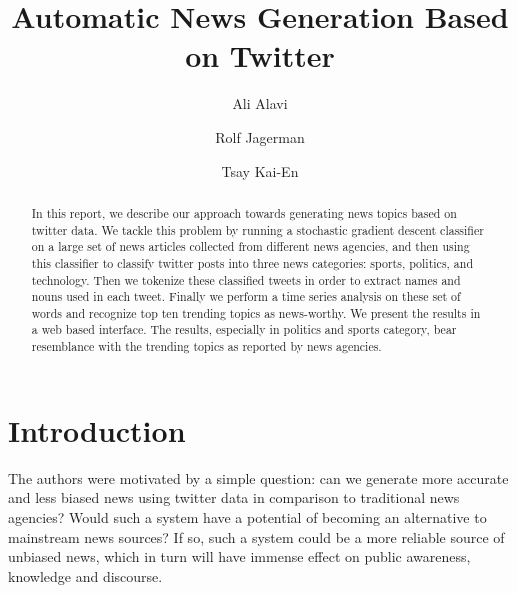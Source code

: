 \documentclass{llncs}
\begin{document}
%
\mainmatter              %
\pagestyle{headings}

%
\title{Automatic News Generation Based on Twitter}
%
%
\author{Ali Alavi \and Rolf Jagerman \and
Tsay Kai-En}
%
%
%

\maketitle              %
%

\begin{abstract}
In this report, we describe our approach towards generating news topics based on twitter data. We tackle this problem by running a stochastic gradient descent classifier on a large set of news articles collected from different news agencies, and then using this classifier to classify twitter posts into three news categories: sports, politics, and technology. Then we tokenize these classified tweets in order to extract names and nouns used in each tweet. Finally we perform a time series analysis on these set of words and recognize top ten trending topics as news-worthy. We present the results in a web based interface. The results, especially in politics and sports category, bear resemblance with the trending topics as reported by news agencies.
\end{abstract}

\section{Introduction}

The authors were motivated by a simple question: can we generate more accurate and less biased news using twitter data in comparison to traditional news agencies? Would such a system have a potential of becoming an alternative to mainstream news sources? If so, such a system could be a more reliable source of unbiased news, which in turn will have immense effect on public awareness, knowledge and discourse.
\end{document}
